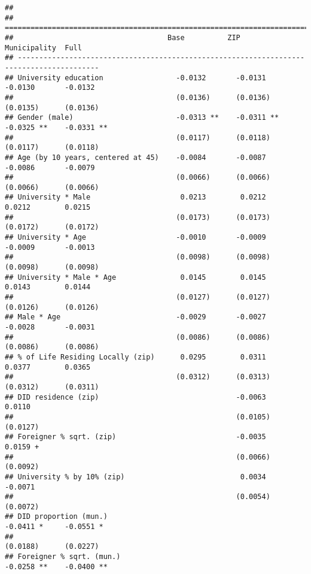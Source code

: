 \documentclass[
]{article}
\begin{document}
\begin{verbatim}
## 
## =========================================================================================
##                                    Base          ZIP           Municipality  Full        
## -----------------------------------------------------------------------------------------
## University education                 -0.0132       -0.0131       -0.0130       -0.0132   
##                                      (0.0136)      (0.0136)      (0.0135)      (0.0136)  
## Gender (male)                        -0.0313 **    -0.0311 **    -0.0325 **    -0.0331 **
##                                      (0.0117)      (0.0118)      (0.0117)      (0.0118)  
## Age (by 10 years, centered at 45)    -0.0084       -0.0087       -0.0086       -0.0079   
##                                      (0.0066)      (0.0066)      (0.0066)      (0.0066)  
## University * Male                     0.0213        0.0212        0.0212        0.0215   
##                                      (0.0173)      (0.0173)      (0.0172)      (0.0172)  
## University * Age                     -0.0010       -0.0009       -0.0009       -0.0013   
##                                      (0.0098)      (0.0098)      (0.0098)      (0.0098)  
## University * Male * Age               0.0145        0.0145        0.0143        0.0144   
##                                      (0.0127)      (0.0127)      (0.0126)      (0.0126)  
## Male * Age                           -0.0029       -0.0027       -0.0028       -0.0031   
##                                      (0.0086)      (0.0086)      (0.0086)      (0.0086)  
## % of Life Residing Locally (zip)      0.0295        0.0311        0.0377        0.0365   
##                                      (0.0312)      (0.0313)      (0.0312)      (0.0311)  
## DID residence (zip)                                -0.0063                      0.0110   
##                                                    (0.0105)                    (0.0127)  
## Foreigner % sqrt. (zip)                            -0.0035                      0.0159 + 
##                                                    (0.0066)                    (0.0092)  
## University % by 10% (zip)                           0.0034                     -0.0071   
##                                                    (0.0054)                    (0.0072)  
## DID proportion (mun.)                                            -0.0411 *     -0.0551 * 
##                                                                  (0.0188)      (0.0227)  
## Foreigner % sqrt. (mun.)                                         -0.0258 **    -0.0400 **

\end{verbatim}
\end{document}
